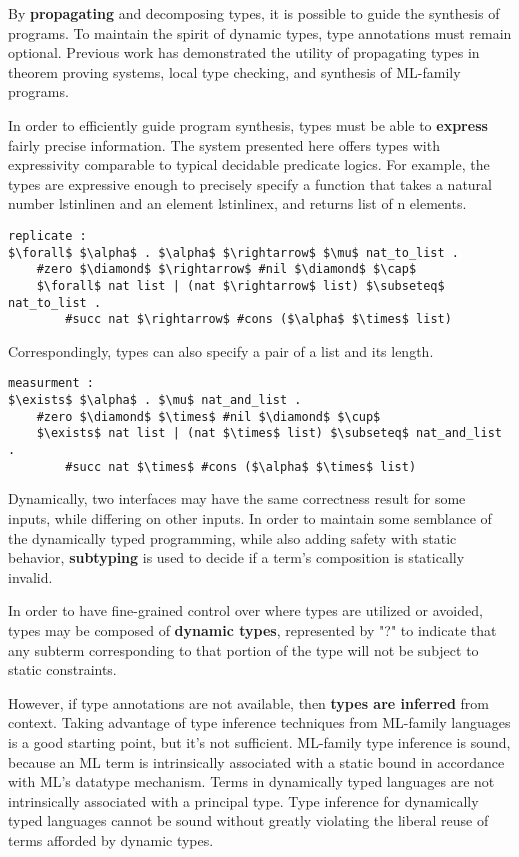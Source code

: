 \documentclass[sigplan,screen]{acmart}
\begin{document}
By \textbf{propagating} and decomposing types, 
it is possible to guide the synthesis of programs.
To maintain the spirit of dynamic types, type annotations must remain optional.
Previous work has demonstrated the utility of propagating types 
in theorem proving systems, local type checking, 
and synthesis of ML-family programs.

In order to efficiently guide program synthesis, 
types must be able to \textbf{express} fairly precise information. 
The system presented here offers types with 
expressivity comparable to typical decidable predicate logics. 
For example, the types are expressive enough to precisely specify
a function that takes a natural number lstinline{n} 
and an element lstinline{x}, 
and returns list of n elements.

\begin{lstlisting}[]
replicate : 
$\forall$ $\alpha$ . $\alpha$ $\rightarrow$ $\mu$ nat_to_list .
    #zero $\diamond$ $\rightarrow$ #nil $\diamond$ $\cap$ 
    $\forall$ nat list | (nat $\rightarrow$ list) $\subseteq$ nat_to_list .
        #succ nat $\rightarrow$ #cons ($\alpha$ $\times$ list)
\end{lstlisting}

\noindent Correspondingly, types can also specify a pair of a list and its length.

\begin{lstlisting}[]
measurment : 
$\exists$ $\alpha$ . $\mu$ nat_and_list .
    #zero $\diamond$ $\times$ #nil $\diamond$ $\cup$ 
    $\exists$ nat list | (nat $\times$ list) $\subseteq$ nat_and_list .
        #succ nat $\times$ #cons ($\alpha$ $\times$ list)
\end{lstlisting}



Dynamically, two interfaces may have the same correctness result for some inputs,
while differing on other inputs.  
In order to maintain some semblance of the dynamically typed programming,
while also adding safety with static behavior,  
\textbf{subtyping} is used to decide if a term's 
composition is statically invalid.   


In order to have fine-grained control over where types are utilized or avoided, 
types may be composed of \textbf{dynamic types}, represented by "?" to indicate 
that any subterm corresponding to that portion of the type 
will not be subject to static constraints.

However, if type annotations are not available, then \textbf{types are inferred} from context. 
Taking advantage of type inference techniques from ML-family languages 
is a good starting point,
but it's not sufficient. ML-family type inference is sound, because an ML term is 
intrinsically associated with a static bound in accordance with ML's datatype mechanism.
Terms in dynamically typed languages are not intrinsically associated with a principal type. 
Type inference for dynamically typed languages cannot be sound without greatly violating the 
liberal reuse of terms afforded by dynamic types. 
\end{document}
